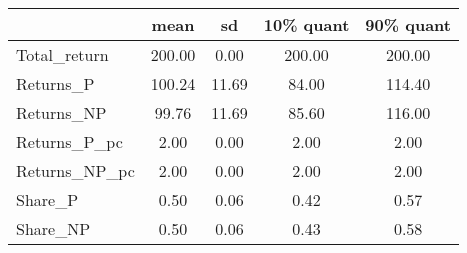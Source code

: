 \begin{tabular}{lcccc}
\toprule
{} &    mean &     sd &  10\% quant &  90\% quant \\
\midrule
Total\_return  &  200.00 &   0.00 &     200.00 &     200.00 \\
Returns\_P     &  100.24 &  11.69 &      84.00 &     114.40 \\
Returns\_NP    &   99.76 &  11.69 &      85.60 &     116.00 \\
Returns\_P\_pc  &    2.00 &   0.00 &       2.00 &       2.00 \\
Returns\_NP\_pc &    2.00 &   0.00 &       2.00 &       2.00 \\
Share\_P       &    0.50 &   0.06 &       0.42 &       0.57 \\
Share\_NP      &    0.50 &   0.06 &       0.43 &       0.58 \\
\bottomrule
\end{tabular}
